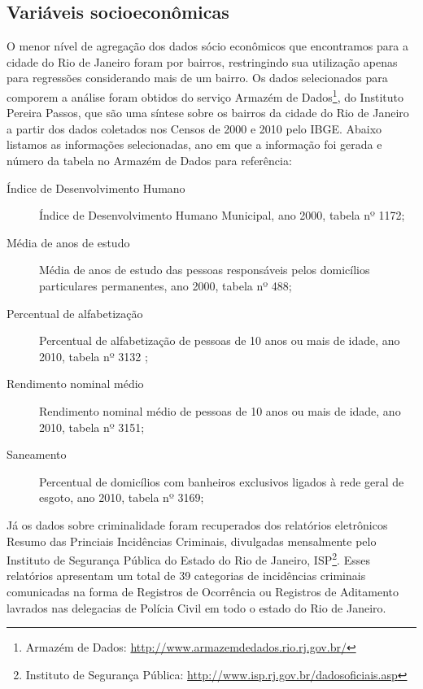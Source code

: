 \subsection{Variáveis socioeconômicas}

O menor nível de agregação dos dados sócio econômicos que encontramos para a cidade do Rio de Janeiro foram por bairros, restringindo sua utilização apenas para regressões considerando mais de um bairro. Os dados selecionados para comporem a análise foram obtidos do serviço Armazém de Dados\footnote{Armazém de Dados: \url{http://www.armazemdedados.rio.rj.gov.br/}}, do Instituto Pereira Passos, que são uma síntese sobre os bairros da cidade do Rio de Janeiro a partir dos dados coletados nos Censos de 2000 e 2010 pelo IBGE. Abaixo listamos as informações selecionadas, ano em que a informação foi gerada e número da tabela no Armazém de Dados para referência:
	
\begin{description}
\item[Índice de Desenvolvimento Humano] Índice de Desenvolvimento Humano Municipal, ano 2000, tabela nº 1172;

\item[Média de anos de estudo] Média de anos de estudo das pessoas responsáveis pelos domicílios particulares permanentes, ano 2000, tabela nº 488;

\item[Percentual de alfabetização] Percentual de alfabetização de pessoas de 10 anos ou mais de idade, ano 2010, tabela nº 3132 ;

\item[Rendimento nominal médio] Rendimento nominal médio de pessoas de 10 anos ou mais de idade, ano 2010, tabela nº 3151;

\item[Saneamento] Percentual de domicílios com banheiros exclusivos ligados à rede geral de esgoto, ano 2010, tabela nº 3169;
\end{description}

Já os dados sobre criminalidade foram recuperados dos relatórios eletrônicos Resumo das Princiais Incidências Criminais, divulgadas mensalmente pelo Instituto de Segurança Pública do Estado do Rio de Janeiro, ISP\footnote{Instituto de Segurança Pública: \url{http://www.isp.rj.gov.br/dadosoficiais.asp}}. Esses relatórios apresentam um total de 39 categorias de incidências criminais comunicadas na forma de Registros de Ocorrência ou Registros de Aditamento lavrados nas delegacias de Polícia Civil em todo o estado do Rio de Janeiro.  

